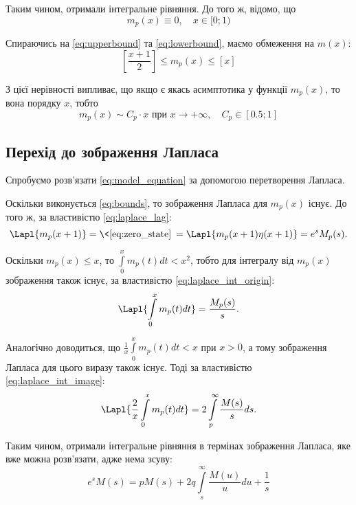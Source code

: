 Таким чином, отримали інтегральне рівняння. До того ж, відомо, що
\begin{equation}
\label{eq:zero_state}
m_{p}(x) \equiv 0, \quad x \in [0; 1)
\end{equation}

Спираючись на \eqref{eq:upperbound} та \eqref{eq:lowerbound}, маємо обмеження на $m(x)$:
\begin{equation}
\label{eq:bounds}
\left[\frac{x+1}{2}\right] \leq m_{p}(x) \leq \left[x\right]
\end{equation}

З цієї нерівності випливає, що якщо є якась асимптотика у функції $m_{p}(x)$, то вона порядку $x$, тобто
\begin{equation}
\label{eq:bounds_inference}
m_{p}(x) \sim C_{p}\cdot x \text{ при } x \rightarrow +\infty, \quad C_{p} \in [0.5; 1]
\end{equation}

\subsection{Перехід до зображення Лапласа}
\label{sec:model_integral_laplace}

Спробуємо розв'язати \eqref{eq:model_equation} за допомогою перетворення Лапласа.

Оскільки виконується \eqref{eq:bounds}, то зображення Лапласа для $m_{p}(x)$ існує. До того ж, за властивістю \eqref{eq:laplace_lag}:
\begin{equation}
\label{eq:model_shifted_laplace}
\Lapl{m_{p}(x+1)}=\<\eqref{eq:zero_state}\>=\Lapl{m_{p}(x+1)\eta(x+1)}=e^s M_{p} (s).
\end{equation}

Оскільки $m_{p}(x) \leq x$, то $\int\limits_0^x m_{p}(t) dt < x^2$, тобто для інтегралу від $m_{p}(x)$ зображення також існує, за властивістю \eqref{eq:laplace_int_origin}:
$$\Lapl{\int\limits_0^x m_p(t) dt} = \frac{M_p(s)}{s}.$$

Аналогічно доводиться, що $\frac{1}{x}\int\limits_0^x m_{p}(t) dt < x$ при $x>0$, а тому зображення Лапласа для цього виразу також існує. Тоді за властивістю \eqref{eq:laplace_int_image}:
$$\Lapl{\frac{2}{x}\int\limits_0^x m_{p}(t) dt} = 2 \int\limits_p^\infty \frac{M(s)}{s} ds.$$

Таким чином, отримали інтегральне рівняння в термінах зображення Лапласа, яке вже можна розв'язати, адже нема зсуву:
\begin{equation}
\label{eq:model_laplace_integral}
e^s M(s) = p M(s) + 2q \int\limits_s^\infty \frac{M(u)}{u} du + \frac{1}{s}
\end{equation}

